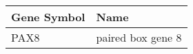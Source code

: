 \begin{tabular}{ll}
\toprule
Gene Symbol &              Name \\
\midrule
       PAX8 & paired box gene 8 \\
\bottomrule
\end{tabular}
